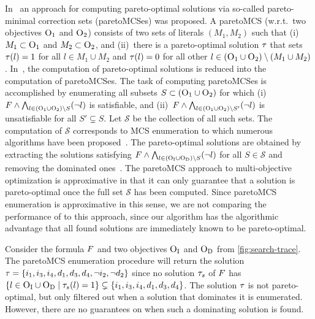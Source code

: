 In~\textcite{DBLP:conf/ijcai/Terra-NevesLM18a,DBLP:conf/aaai/Terra-NevesLM18,DBLP:conf/ijcai/Terra-NevesLM18} an approach for computing pareto-optimal solutions via so-called pareto-minimal correction sets (paretoMCSes) was proposed.
A paretoMCS (w.r.t.\ two objectives $\textsc{O}_1$ and $\textsc{O}_2$) consists of two sets of literals $(M_1, M_2)$ such that (i)~$M_1 \subset \textsc{O}_1$ and $M_2 \subset \textsc{O}_2$, and (ii)~there is a pareto-optimal solution $\tau$ that sets $\tau(l) = 1$ for all $l \in M_1 \cup M_2$ and $\tau(l) = 0$ for all other $l \in (\textsc{O}_1 \cup \textsc{O}_2) \setminus (M_1 \cup M_2)$.
In~\textcite{DBLP:conf/ijcai/Terra-NevesLM18a}, the computation of pareto-optimal solutions is reduced into the computation of paretoMCSes.
The task of computing paretoMCSes is accomplished by enumerating all subsets $S \subset  (\textsc{O}_1 \cup \textsc{O}_2)$ for which (i)~$F \land \bigwedge_{l \in  (\textsc{O}_1 \cup \textsc{O}_2) \setminus S} (\lnot l)$ is satisfiable, and (ii)~$F \land \bigwedge_{l \in  (\textsc{O}_1 \cup \textsc{O}_2) \setminus S'} (\lnot l)$ is unsatisfiable for all $S' \subsetneq S$.
Let $\mathcal{S}$ be the collection of all such sets.
The computation of $\mathcal{S}$ corresponds to MCS enumeration to which numerous algorithms have been proposed~\autocite{DBLP:conf/lpar/BendikC20,DBLP:conf/hvc/MorgadoLM12,DBLP:conf/sat/PrevitiMJM17}.
The pareto-optimal solutions are obtained by extracting the solutions satisfying $F \land \bigwedge_{l \in  (\textsc{O}_{\text{I}} \cup \textsc{O}_{\text{D}}) \setminus S} (\lnot l)$ for all $S \in \mathcal{S}$ and removing the dominated ones~\autocite{DBLP:conf/ijcai/Terra-NevesLM18a}.
The paretoMCS approach to multi-objective optimization is approximative in that it can only guarantee that a solution is pareto-optimal once the full set $\mathcal{S}$ has been computed.
Since paretoMCS enumeration is approximative in this sense, we are not comparing the performance of \algname{} to this approach, since our algorithm has the algorithmic advantage that all found solutions are immediately known to be pareto-optimal.

\begin{example}\label{ex:MCS}
  Consider the formula $F$ and two objectives $\textsc{O}_{\text{I}}$ and $\textsc{O}_{\text{D}}$ from \cref{fig:search-trace}.
  The paretoMCS enumeration procedure will return the solution $\tau = {\{i_1,\allowbreak i_3,\allowbreak i_4,\allowbreak d_1,\allowbreak d_3,\allowbreak d_4,\allowbreak \lnot i_2,\allowbreak \lnot d_2\}}$ since no solution $\tau_s$ of $F$ has $\{l \in \textsc{O}_{\text{I}} \cup \textsc{O}_{\text{D}} \mid  \tau_s(l) = 1\} \subsetneq \{i_1, i_3, i_4, d_1, d_3, d_4\}$.
  The solution $\tau$ is not pareto-optimal, but only filtered out when a solution that dominates it is enumerated.
  However, there are no guarantees on when such a dominating solution is found. 
\end{example}

